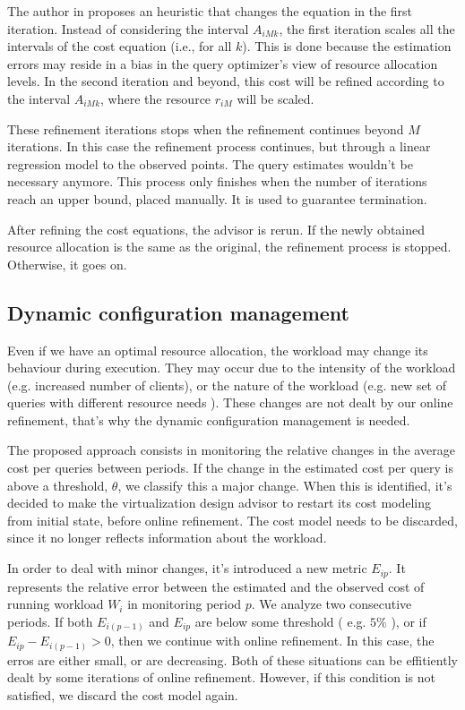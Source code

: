 The author in \cite{Soror:2008:AVM:1376616.1376711} proposes an heuristic that changes the equation in the first iteration. Instead of  considering the interval $A_{iMk}$, the first iteration scales all the intervals of the cost equation (i.e., for all $k$). This is done because the estimation errors may reside in a bias in the query optimizer's view of resource allocation levels. In the second iteration and beyond, this cost will be refined according to the interval $A_{iMk}$, where the resource $r_{iM}$ will be scaled.

These refinement iterations stops when the refinement continues beyond $M$ iterations. In this case the refinement process continues, but through a linear regression model to the observed points. The query estimates wouldn't be necessary anymore. This process only finishes when the number of iterations reach an upper bound, placed manually. It is used to guarantee termination.

After refining the cost equations, the advisor is rerun. If the newly obtained resource allocation is the same as the original, the refinement process is stopped. Otherwise, it goes on.

\subsection{Dynamic configuration management}

Even if we have an optimal resource allocation, the workload may change its behaviour during execution. They may occur due to the intensity of the workload (e.g. increased number of clients), or the nature of the workload (e.g. new set of queries with different resource needs ). These changes are not dealt by our online refinement, that's why the dynamic configuration management is needed. 

The proposed approach consists in monitoring the relative changes in the average cost per queries between periods. If the change in the estimated cost per query is above a threshold, $\theta$, we classify this a major change. When this is identified, it's decided to make the virtualization design advisor to restart its cost modeling from initial state, before online refinement. The cost model needs to be discarded, since it no longer reflects information about the workload.

In order to deal with minor changes, it's introduced a new metric $E_{ip}$. It represents the relative error between the estimated and the observed cost of running workload $W_{i}$ in monitoring period $p$. We analyze two consecutive periods. If both $E_{i(p-1)}$ and $E_{ip}$ are below some threshold ( e.g. $5\%$ ), or if $E_{ip} - E_{i(p-1)} > 0$, then we continue with online refinement. In this case, the erros are either small, or are decreasing. Both of these situations can be effitiently dealt by some iterations of online refinement. However, if this condition is not satisfied, we discard the cost model again. 